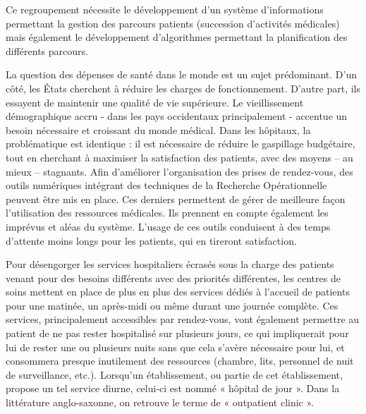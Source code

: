 \documentclass{polytech/polytech}
\begin{document}
Ce regroupement nécessite le développement d'un système d'informations permettant la gestion des parcours patients (succession d'activités médicales) mais également le développement d'algorithmes permettant la planification des différents parcours.


La question des dépenses de santé dans le monde est un sujet prédominant. D'un côté, les États cherchent à réduire les charges de fonctionnement. D'autre part, ils essayent de maintenir une qualité de vie supérieure. Le vieillissement démographique accru - dans les pays occidentaux principalement - accentue un besoin nécessaire et croissant du monde médical. Dans les hôpitaux, la problématique est identique : il est nécessaire de réduire le gaspillage budgétaire, tout en cherchant à maximiser la satisfaction des patients, avec des moyens – au mieux – stagnants. Afin d'améliorer l'organisation des prises de rendez-vous, des outils numériques intégrant des techniques de la Recherche Opérationnelle peuvent être mis en place. Ces derniers permettent de gérer de meilleure façon l'utilisation des ressources médicales. Ils prennent en compte également les imprévus et aléas du système. L'usage de ces outils conduisent à des temps d'attente moins longs pour les patients, qui en tireront satisfaction.

Pour désengorger les services hospitaliers écrasés sous la charge des patients venant pour des besoins différents avec des priorités différentes, les centres de soins mettent en place de plus en plus des services dédiés à l'accueil de patients pour une matinée, un après-midi ou même durant une journée complète. Ces services, principalement accessibles par rendez-vous, vont également permettre au patient de ne pas rester hospitalisé sur plusieurs jours, ce qui impliquerait pour lui de rester une ou plusieurs nuits sans que cela s'avère nécessaire pour lui, et consommera presque inutilement des ressources (chambre, lits, personnel de nuit de surveillance, etc.). Lorsqu'un établissement, ou partie de cet établissement, propose un tel service diurne, celui-ci est nommé « hôpital de jour ». Dans la littérature anglo-saxonne, on retrouve le terme de « outpatient clinic ».
\end{document}
